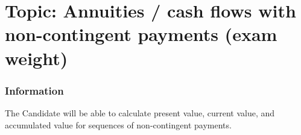\chapter[Topic: Annuities / cash flows with non-contingent payments]{Topic: Annuities / cash flows with non-contingent payments (exam weight)}

\subsection{Information}

\begin{distributions}[Objective]
The Candidate will be able to calculate present value, current value, and accumulated value for sequences of non-contingent payments.
\end{distributions}

